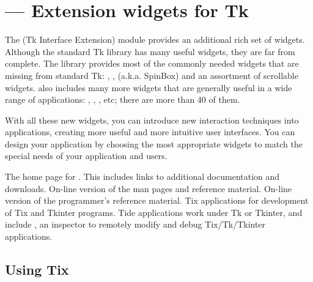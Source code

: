 \section{ ---
         Extension widgets for Tk}



The  (Tk Interface Extension) module provides an
additional rich set of widgets. Although the standard Tk library has
many useful widgets, they are far from complete. The 
library provides most of the commonly needed widgets that are missing
from standard Tk: , , 
(a.k.a. SpinBox) and an assortment of scrollable widgets. 
also includes many more widgets that are generally useful in a wide
range of applications: , ,
, etc; there are more than 40 of them.

With all these new widgets, you can introduce new interaction
techniques into applications, creating more useful and more intuitive
user interfaces. You can design your application by choosing the most
appropriate widgets to match the special needs of your application and
users. 

\begin{seealso}
        {The home page for .  This includes links to
         additional documentation and downloads.}
        {On-line version of the man pages and reference material.}
        {On-line version of the programmer's reference material.}
        {Tix applications for development of Tix and Tkinter programs.
         Tide applications work under Tk or Tkinter, and include
         , an inspector to remotely modify and
         debug Tix/Tk/Tkinter applications.}
\end{seealso}


\subsection{Using Tix}

